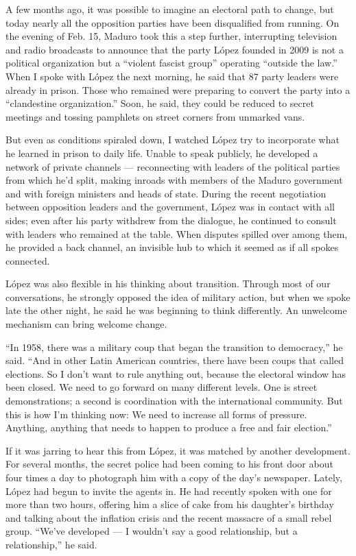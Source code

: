A few months ago, it was possible to imagine an electoral path to
change, but today nearly all the opposition parties have been
disqualified from running. On the evening of Feb. 15, Maduro took this a
step further, interrupting television and radio broadcasts to announce
that the party López founded in 2009 is not a political organization but
a ``violent fascist group'' operating ``outside the law.'' When I spoke
with López the next morning, he said that 87 party leaders were already
in prison. Those who remained were preparing to convert the party into a
``clandestine organization.'' Soon, he said, they could be reduced to
secret meetings and tossing pamphlets on street corners from unmarked
vans.

But even as conditions spiraled down, I watched López try to incorporate
what he learned in prison to daily life. Unable to speak publicly, he
developed a network of private channels --- reconnecting with leaders of
the political parties from which he'd split, making inroads with members
of the Maduro government and with foreign ministers and heads of state.
During the recent negotiation between opposition leaders and the
government, López was in contact with all sides; even after his party
withdrew from the dialogue, he continued to consult with leaders who
remained at the table. When disputes spilled over among them, he
provided a back channel, an invisible hub to which it seemed as if all
spokes connected.

López was also flexible in his thinking about transition. Through most
of our conversations, he strongly opposed the idea of military action,
but when we spoke late the other night, he said he was beginning to
think differently. An unwelcome mechanism can bring welcome change.

``In 1958, there was a military coup that began the transition to
democracy,'' he said. ``And in other Latin American countries, there
have been coups that called elections. So I don't want to rule anything
out, because the electoral window has been closed. We need to go forward
on many different levels. One is street demonstrations; a second is
coordination with the international community. But this is how I'm
thinking now: We need to increase all forms of pressure. Anything,
anything that needs to happen to produce a free and fair election.''

If it was jarring to hear this from López, it was matched by another
development. For several months, the secret police had been coming to
his front door about four times a day to photograph him with a copy of
the day's newspaper. Lately, López had begun to invite the agents in. He
had recently spoken with one for more than two hours, offering him a
slice of cake from his daughter's birthday and talking about the
inflation crisis and the recent massacre of a small rebel group. ``We've
developed --- I wouldn't say a good relationship, but a relationship,''
he said.


